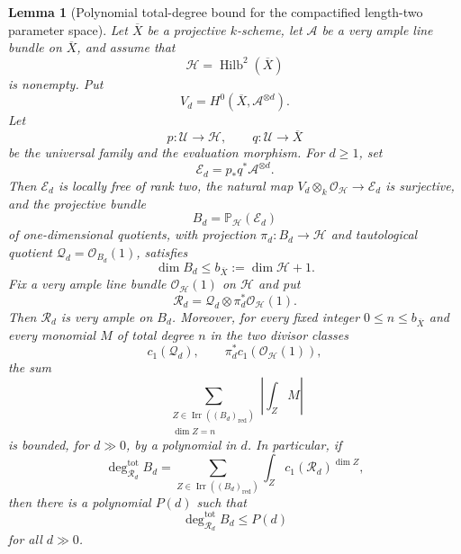 \documentclass{lms}
\newtheorem{lemma}[theorem]{Lemma}
\DeclareMathOperator{\Hilb}{Hilb}
\newcommand{\PP}{\mathbb P}
\newcommand{\Ample}{\mathcal A}
\newcommand{\OO}{\mathcal O}
\newcommand{\barX}{\overline{X}}
\begin{document}
\begin{lemma}[Polynomial total-degree bound for the compactified length-two parameter space]\label{lem:length-two-degree}
Let $\barX$ be a projective $k$-scheme, let $\Ample$ be a very ample line bundle on $\barX$, and assume that
\[
        \mathcal H=\Hilb^2(\barX)
\]
is nonempty.  Put
\[
        V_d=H^0(\barX,\Ample^{\otimes d}).
\]
Let
\[
        p:\mathcal U\to\mathcal H,
        \qquad
        q:\mathcal U\to\barX
\]
be the universal family and the evaluation morphism.  For $d\ge1$, set
\[
        \mathcal E_d=p_*q^*\Ample^{\otimes d}.
\]
Then $\mathcal E_d$ is locally free of rank two, the natural map $V_d\otimes_k\OO_{\mathcal H}\to\mathcal E_d$ is surjective, and the projective bundle
\[
        B_d=\PP_{\mathcal H}(\mathcal E_d)
\]
of one-dimensional quotients, with projection $\pi_d:B_d\to\mathcal H$ and tautological quotient $\mathcal Q_d=\OO_{B_d}(1)$, satisfies
\[
        \dim B_d\le b_{\barX}:=\dim\mathcal H+1.
\]
Fix a very ample line bundle $\OO_{\mathcal H}(1)$ on $\mathcal H$ and put
\[
        \mathcal R_d=\mathcal Q_d\otimes \pi_d^*\OO_{\mathcal H}(1).
\]
Then $\mathcal R_d$ is very ample on $B_d$.  Moreover, for every fixed integer $0\le n\le b_{\barX}$ and every monomial $M$ of total degree $n$ in the two divisor classes
\[
        c_1(\mathcal Q_d),\qquad \pi_d^*c_1(\OO_{\mathcal H}(1)),
\]
the sum
\[
        \sum_{\substack{Z\in\operatorname{Irr}((B_d)_{\mathrm{red}})\\ \dim Z=n}}
        \left|\int_Z M\right|
\]
is bounded, for $d\gg0$, by a polynomial in $d$.  In particular, if
\[
        \deg^{\mathrm{tot}}_{\mathcal R_d}B_d
        =\sum_{Z\in\operatorname{Irr}((B_d)_{\mathrm{red}})}
        \int_Z c_1(\mathcal R_d)^{\dim Z},
\]
then there is a polynomial $P(d)$ such that
\[
        \deg^{\mathrm{tot}}_{\mathcal R_d}B_d\le P(d)
\]
for all $d\gg0$.
\end{lemma}
\end{document}
